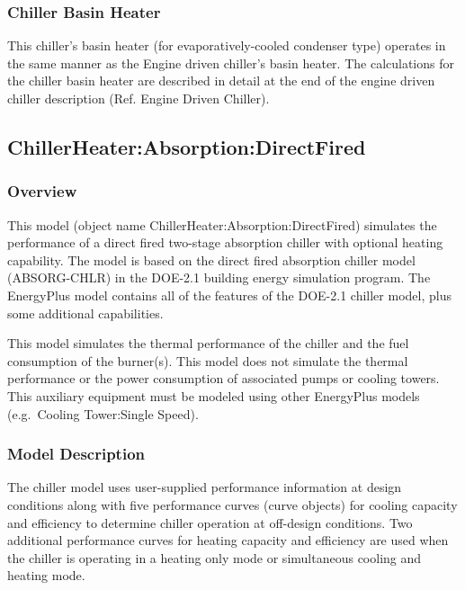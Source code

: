 \subsubsection{Chiller Basin Heater}\label{chiller-basin-heater}

This chiller's basin heater (for evaporatively-cooled condenser type) operates in the same manner as the Engine driven chiller's basin heater. The calculations for the chiller basin heater are described in detail at the end of the engine driven chiller description (Ref. Engine Driven Chiller).

\subsection{ChillerHeater:Absorption:DirectFired}\label{chillerheaterabsorptiondirectfired}

\subsubsection{Overview}\label{overview-009}

This model (object name ChillerHeater:Absorption:DirectFired) simulates the performance of a direct fired two-stage absorption chiller with optional heating capability. The model is based on the direct fired absorption chiller model (ABSORG-CHLR) in the DOE-2.1 building energy simulation program. The EnergyPlus model contains all of the features of the DOE-2.1 chiller model, plus some additional capabilities.

This model simulates the thermal performance of the chiller and the fuel consumption of the burner(s). This model does not simulate the thermal performance or the power consumption of associated pumps or cooling towers. This auxiliary equipment must be modeled using other EnergyPlus models (e.g.~Cooling Tower:Single Speed).

\subsubsection{Model Description}\label{model-description-006}

The chiller model uses user-supplied performance information at design conditions along with five performance curves (curve objects) for cooling capacity and efficiency to determine chiller operation at off-design conditions. Two additional performance curves for heating capacity and efficiency are used when the chiller is operating in a heating only mode or simultaneous cooling and heating mode.

